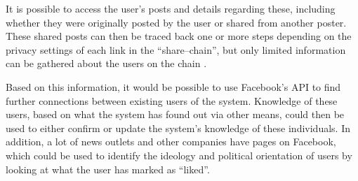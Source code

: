 It is possible to access the user's posts and details regarding these, including whether they were originally
posted by the user or shared from another poster.
These shared posts can then be traced back one or more steps depending on the
privacy settings of each link in the ``share--chain'', but only limited
information can be gathered about the users on the chain \Source.\nl

Based on this information, it would be possible to use Facebook's API to find
further connections between existing users of the system.
Knowledge of these users, based on what the system has found out via other means, could then be used to either confirm
or update the system's knowledge of these individuals.
In addition, a lot of news outlets and other companies have pages on Facebook,
which could be used to identify the ideology and political orientation of
users by looking at what the user has marked as ``liked''.
